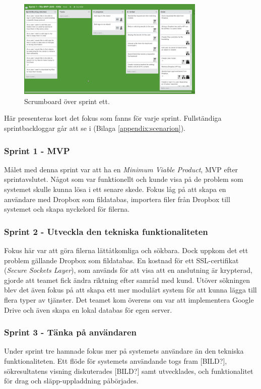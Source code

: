 \begin{figure}[!H]
\centering
\includegraphics[width=0.8\textwidth]{figures/trello.png}
\caption{Scrumboard över sprint ett.}
\label{fig:trello}
\end{figure}

Här presenteras kort det fokus som fanns för varje sprint. Fullständiga sprintbackloggar går att se i (Bilaga \ref{appendix:scenarion}).

\subsubsection{Sprint 1 - MVP}
Målet med denna sprint var att ha en \textit{Minimum Viable Product}, MVP\cite{mvp} efter sprintavslutet. Något som var funktionellt och kunde visa på de problem som systemet skulle kunna lösa i ett senare skede. Fokus låg på att skapa en användare med Dropbox som fildatabas, importera filer från Dropbox till systemet och skapa nyckelord för filerna.

\subsubsection{Sprint 2 - Utveckla den tekniska funktionaliteten}
Fokus här var att göra filerna lättåtkomliga och sökbara. Dock uppkom det ett problem gällande Dropbox som fildatabas. En kostnad för ett SSL-certifikat (\textit{Secure Sockets Layer}), som används för att visa att en anslutning är krypterad, gjorde att teamet fick ändra riktning efter samråd med kund. Utöver sökningen blev det även fokus på att skapa ett mer modulärt system för att kunna lägga till flera typer av tjänster. Det teamet kom överens om var att implementera Google Drive och även skapa en lokal databas för egen server.

\subsubsection{Sprint 3 - Tänka på användaren}
Under sprint tre hamnade fokus mer på systemets användare än den tekniska funktionaliteten. Ett flöde för systemets användande togs fram [BILD?], sökresultatens visning diskuterades [BILD?] samt utvecklades, och funktionalitet för drag och släpp-uppladdning påbörjades.

